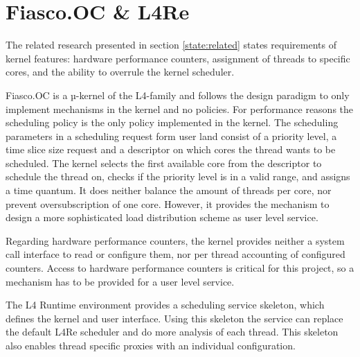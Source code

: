 \section{Fiasco.OC \& L4Re}
\label{state:env}
The related research presented in section \ref{state:related} states
requirements of kernel features:
hardware performance counters, assignment of threads to specific
cores, and the ability to overrule the kernel scheduler.

Fiasco.OC is a µ-kernel of the L4-family and follows the design paradigm to
only implement mechanisms in the kernel and no policies.
For performance reasons the scheduling policy is the only policy implemented in
the kernel.
The scheduling parameters in a scheduling request form user land consist of
a priority level, a time slice size request and a descriptor on which cores the
thread wants to be scheduled.
The kernel selects the first available core from the descriptor to schedule the
thread on, checks if the priority level is in a valid range, and assigns a time
quantum.
It does neither balance the amount of threads per core, nor prevent
oversubscription of one core.
However, it provides the mechanism to design a more sophisticated load
distribution scheme as user level service.

Regarding hardware performance counters, the kernel provides neither a system
call interface to read or configure them, nor per thread accounting of
configured counters.
Access to hardware performance counters is critical for this project, so a
mechanism has to be provided for a user level service.

The L4 Runtime environment provides a scheduling service skeleton, which
defines the kernel and user interface.
Using this skeleton the service can replace the default L4Re scheduler and do
more analysis of each thread.
This skeleton also enables thread specific proxies with an individual
configuration.

\begin{comment}
\textbf{Fiasco.OC}
\begin{itemize}
  \item Kernel scheduler does no balancing, assigns thread to the first
    core specified in the affinity descriptor
  \item affinity descriptor: core(s) a thread should run on
  \item Syscall via run\_thread() to pass affinity descr to kernel scheduler
  \item interface to query execution time for each thread
  \item capability system -- to derive communication relationships from
  \item	Kernel feature wishes derived from related work: Performance counters
    and per thread accounting
\end{itemize}

\textbf{L4Re}
\begin{itemize}
  \item provides scheduler proxy interface, including affinity descriptor,
    scheduling parameters
  \item syscall interface
\end{itemize}
\end{comment}


